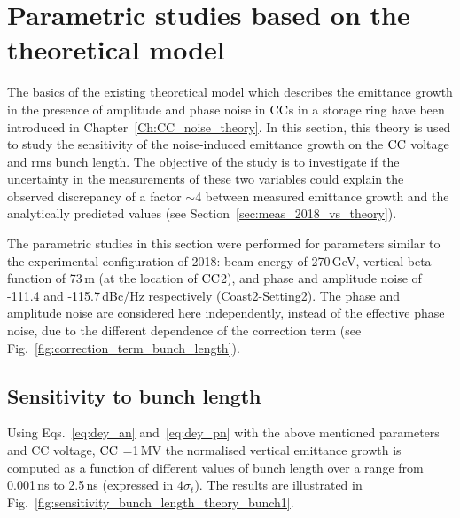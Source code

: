 \section{Parametric studies based on the theoretical model}\label{sec:paramteric_studies_theory}

The basics of the existing theoretical model which describes the emittance growth in the presence of amplitude and phase noise in ${\mathrm{CC}}$s in a storage ring have been introduced in Chapter~\ref{Ch:CC_noise_theory}. In this section, this theory is used to study the sensitivity of the noise-induced emittance growth on the ${\mathrm{CC}}$ voltage and rms bunch length. The objective of the study is to investigate if the uncertainty in the measurements of these two variables could explain the observed discrepancy of a factor $\sim$4 between measured emittance growth and the analytically predicted values (see Section~\ref{sec:meas_2018_vs_theory}).

The parametric studies in this section were performed for parameters similar to the experimental configuration of 2018: beam energy of 270\,GeV, vertical beta function of 73\,m (at the location of ${\mathrm{CC}}$2), and phase and amplitude noise of -111.4 and -115.7\,dBc/Hz respectively (Coast2-Setting2). The phase and amplitude noise are considered here independently, instead of the effective phase noise, due to the different dependence of the correction term (see Fig.~\ref{fig:correction_term_bunch_length}).

\subsection{Sensitivity to bunch length}\label{subsec:bunch_length_dependence}
Using Eqs.~\eqref{eq:dey_an} and~\eqref{eq:dey_pn} with the above mentioned parameters and CC voltage, ${\mathrm{CC}}$
=1\,MV the normalised vertical emittance growth is computed as a function of different values of bunch length over a range from 0.001\,ns to 2.5\,ns (expressed in $4\sigma_t$). The results are illustrated in Fig.~\ref{fig:sensitivity_bunch_length_theory_bunch1}. 

